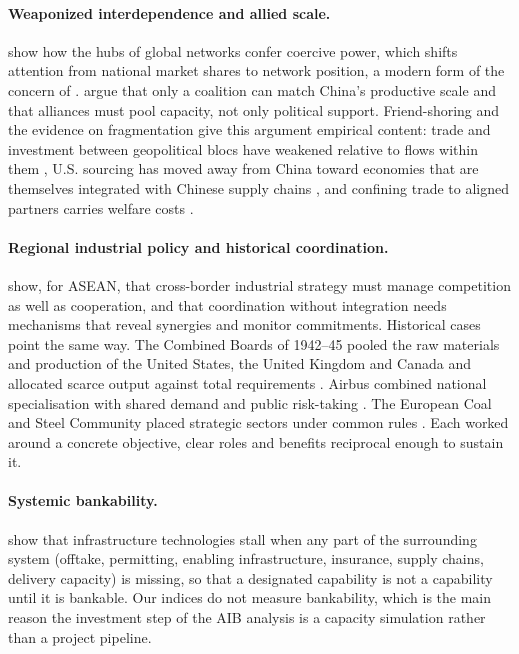 \paragraph{Weaponized interdependence and allied scale.} \citet{farrell2019weaponized} show how
the hubs of global networks confer coercive power, which shifts attention from national market
shares to network position, a modern form of the concern of \citet{hirschman1945national}.
\citet{campbell2025underestimating} argue that only a coalition can match China's productive
scale and that alliances must pool capacity, not only political support. Friend-shoring
\citep{yellen2022remarks} and the evidence on fragmentation give this argument empirical content:
trade and investment between geopolitical blocs have weakened relative to flows within them
\citep{gopinath2025changing}, U.S. sourcing has moved away from China toward economies that are
themselves integrated with Chinese supply chains \citep{alfaro2023global, freund2024us}, and
confining trade to aligned partners carries welfare costs \citep{goes2022impact,
javorcik2024economic, aiyar2023geoeconomic}.

\paragraph{Regional industrial policy and historical coordination.}
\citet{albertone2025regional} show, for ASEAN, that cross-border industrial strategy must manage
competition as well as cooperation, and that coordination without integration needs mechanisms
that reveal synergies and monitor commitments. Historical cases point the same way. The Combined
Boards of 1942--45 pooled the raw materials and production of the United States, the United
Kingdom and Canada and allocated scarce output against total requirements
\citep{usdos1942combined, uswpb1944war}. Airbus combined national specialisation with shared
demand and public risk-taking \citep{ec2022industrial, imf2024industrial}. The European Coal and
Steel Community placed strategic sectors under common rules \citep{eu1951ecsc}. Each worked
around a concrete objective, clear roles and benefits reciprocal enough to sustain it.

\paragraph{Systemic bankability.} \citet{spokas2025systemic} show that infrastructure
technologies stall when any part of the surrounding system (offtake, permitting, enabling
infrastructure, insurance, supply chains, delivery capacity) is missing, so that a designated
capability is not a capability until it is bankable. Our indices do not measure bankability,
which is the main reason the investment step of the AIB analysis is a capacity simulation rather
than a project pipeline.

